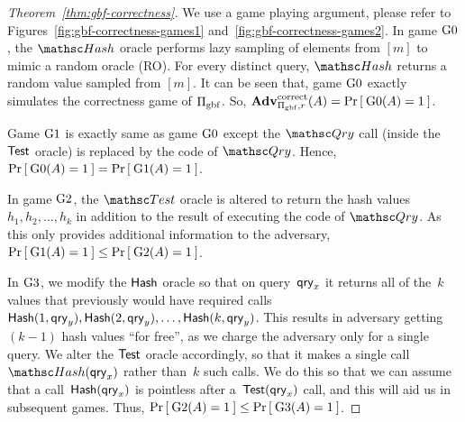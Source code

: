 \begin{proof}[Theorem~\ref{thm:gbf-correctness}]
We use a game playing argument, please refer to Figures~\ref{fig:gbf-correctness-games1} and~\ref{fig:gbf-correctness-games2}. In game $\text{G0}$, the $\Hash$ oracle performs lazy sampling of elements from $[m]$ to mimic a random oracle (RO). For every distinct query, $\Hash$ returns a random value sampled from $[m]$. It can be seen that, game $\text{G0}$ exactly simulates the correctness game of $\Pi_{\mathrm{gbf}}$.  So, $\mathrm{\mathbf{Adv}}^{\mathrm{correct}}_{\Pi_{\mathrm{gbf}},r}(A) = \Pr\left[\: \text{G0}(A) = 1 \:\right]$.

Game $\text{G1}$ is exactly same as game $\text{G0}$ except the $\Qry$ call (inside the $\mathsf{Test}$ oracle) is replaced by the code of $\Qry$.  Hence, $\Pr\left[\: \text{G0}(A) = 1 \:\right] = \Pr\left[\: \text{G1}(A) = 1 \:\right]$.

In game $\text{G2}$, the $\Test$ oracle is altered to return the hash values~$h_1,h_2,\ldots, h_k$ in addition to the result of executing the code of $\Qry$.  As this only provides additional information to the adversary, $\Pr\left[\: \text{G1}(A) = 1 \:\right] \leq \Pr\left[\: \text{G2}(A) = 1 \:\right]$.

In $\text{G3}$, we modify the $\mathsf{Hash}$ oracle so that on query~$\mathsf{qry}_x$ it returns all of the~$k$ values that previously would have required calls $\HashOracle(1,\qry_y),\HashOracle(2,\qry_y),\ldots,\linebreak\HashOracle(k,\qry_y)$.  This results in adversary getting $(k-1)$ hash values ``for free'', as we charge the adversary only for a single query.  We alter the $\mathsf{Test}$ oracle accordingly, so that it makes a single call $\Hash(\qry_x)$ rather than~$k$ such calls.  
We do this so that we can assume that a call~$\mathsf{Hash}(\mathsf{qry}_x)$ is pointless after a~$\mathsf{Test}(\mathsf{qry}_x)$ call, and this will aid us in subsequent games.    Thus, $\Pr\left[\: \text{G2}(A) = 1 \:\right] \leq \Pr\left[\: \text{G3}(A) = 1 \:\right]$. 


\end{proof}
